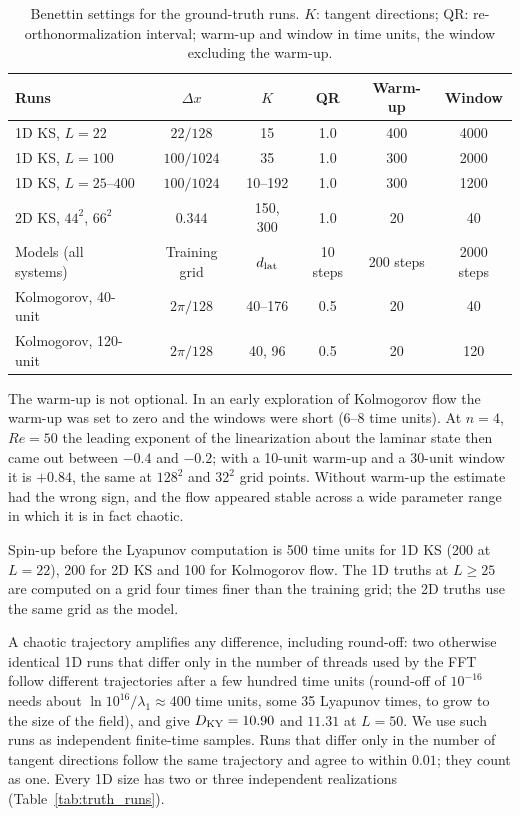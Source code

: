 \begin{table}[htbp]
\caption{Benettin settings for the ground-truth runs. $K$: tangent
directions; QR: re-orthonormalization interval; warm-up and window in
time units, the window excluding the warm-up.}
\label{tab:benettin}
\begin{ruledtabular}
\begin{tabular}{lccccc}
Runs & $\Delta x$ & $K$ & QR & Warm-up & Window \\
\hline
1D KS, $L=22$ & $22/128$ & 15 & 1.0 & 400 & 4000 \\
1D KS, $L=100$ & $100/1024$ & 35 & 1.0 & 300 & 2000 \\
1D KS, $L=25$--$400$ & $100/1024$ & 10--192 & 1.0 & 300 & 1200 \\
2D KS, $44^2$, $66^2$ & $0.344$ & 150, 300 & 1.0 & 20 & 40 \\
Models (all systems) & Training grid & $d_{\mathrm{lat}}$ & 10 steps & 200 steps & 2000 steps \\
Kolmogorov, 40-unit & $2\pi/128$ & 40--176 & 0.5 & 20 & 40 \\
Kolmogorov, 120-unit & $2\pi/128$ & 40, 96 & 0.5 & 20 & 120 \\
\end{tabular}
\end{ruledtabular}
\end{table}

The warm-up is not optional. In an early exploration of Kolmogorov flow
the warm-up was set to zero and the windows were short (6--8 time units).
At $n=4$, $Re=50$ the leading exponent of the linearization about the
laminar state then came out between $-0.4$ and $-0.2$; with a 10-unit
warm-up and a 30-unit window it is $+0.84$, the same at $128^2$ and $32^2$
grid points. Without warm-up the estimate had the wrong sign, and the
flow appeared stable across a wide parameter range in which it is in fact
chaotic.

Spin-up before the Lyapunov computation is 500 time units for 1D KS
(200 at $L=22$), 200 for 2D KS and 100 for Kolmogorov flow. The 1D truths
at $L\ge25$ are computed on a grid four times finer than the training
grid; the 2D truths use the same grid as the model.

 A chaotic trajectory amplifies any
difference, including round-off: two otherwise identical 1D runs that
differ only in the number of threads used by the FFT follow different
trajectories after a few hundred time units (round-off of $10^{-16}$ needs
about $\ln 10^{16}/\lambda_1\approx400$ time units, some 35 Lyapunov times, to
grow to the size of the field), and give $D_{\mathrm{KY}}=10.90$ and
$11.31$ at $L=50$. We use such runs as independent finite-time samples.
Runs that differ only in the number of tangent directions follow the
same trajectory and agree to within $0.01$; they count as one. Every
1D size has two or three independent realizations
(Table~\ref{tab:truth_runs}).

